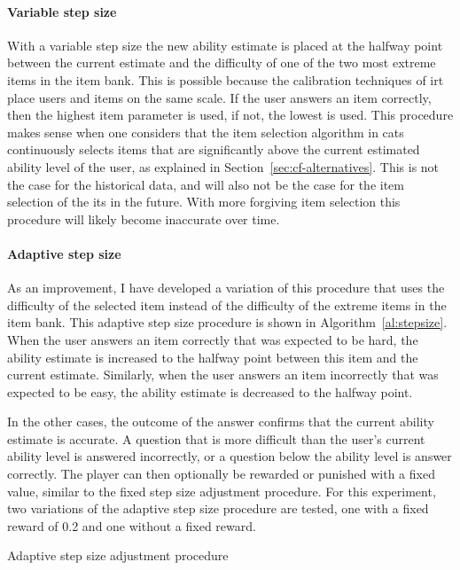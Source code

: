 \paragraph{Variable step size} With a variable step size the new ability estimate is placed at the halfway point between the current estimate and the difficulty of one of the two most extreme items in the item bank.
This is possible because the calibration techniques of \gls{irt} place users and items on the same scale.
If the user answers an item correctly, then the highest item parameter is used, if not, the lowest is used.
This procedure makes sense when one considers that the item selection algorithm in \glspl{cat} continuously selects items that are significantly above the current estimated ability level of the user, as explained in Section~\ref{sec:cf-alternatives}.
This is not the case for the historical data, and will also not be the case for the item selection of the \gls{its} in the future.
With more forgiving item selection this procedure will likely become inaccurate over time.

\paragraph{Adaptive step size} As an improvement, I have developed a variation of this procedure that uses the difficulty of the selected item instead of the difficulty of the extreme items in the item bank.
This adaptive step size procedure is shown in Algorithm~\ref{al:stepsize}.
When the user answers an item correctly that was expected to be hard, the ability estimate is increased to the halfway point between this item and the current estimate.
Similarly, when the user answers an item incorrectly that was expected to be easy, the ability estimate is decreased to the halfway point.

In the other cases, the outcome of the answer confirms that the current ability estimate is accurate.
A question that is more difficult than the user's current ability level is answered incorrectly, or a question below the ability level is answer correctly.
The player can then optionally be rewarded or punished with a fixed value, similar to the fixed step size adjustment procedure.
For this experiment, two variations of the adaptive step size procedure are tested, one with a fixed reward of 0.2 and one without a fixed reward.

\begin{algorithm}[H]
\SetAlgoLined
{}
\caption{\label{al:stepsize}Adaptive step size adjustment procedure}
\end{algorithm}

